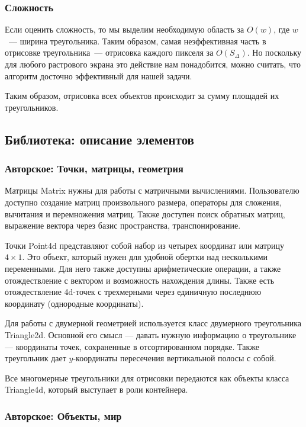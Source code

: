 \documentclass{article}
\begin{document}
\subsubsection{Сложность}

Если оценить сложность, то мы выделим необходимую область за $O(w)$, где $w$~--- ширина треугольника. Таким образом, самая неэффективная часть в отрисовке треугольника~--- отрисовка каждого пикселя за $O(S_{\Delta})$. Но поскольку для любого растрового экрана это действие нам понадобится, можно считать, что алгоритм досточно эффективный для нашей задачи.

Таким образом, отрисовка всех объектов происходит за сумму площадей их треугольников.

\newpage

\subsection{Библиотека: описание элементов}

\subsubsection{Авторское: Точки, матрицы, геометрия}

Матрицы Matrix нужны для работы с матричными вычислениями. Пользователю доступно создание матриц произвольного размера, операторы для сложения, вычитания и перемножения матриц. Также доступен поиск обратных матриц, выражение вектора через базис пространства, транспонирование.

Точки Point4d представляют собой набор из четырех координат или матрицу $4 \times 1$. Это объект, который нужен для удобной обертки над несколькими переменными. Для него также доступны арифметические операции, а также отождествление с вектором и возможность нахождения длины. Также есть отождествление 4d-точек с трехмерными через единичную последнюю координату (однородные координаты).

Для работы с двумерной геометрией используется класс двумерного треугольника Triangle2d. Основной его смысл — давать нужную информацию о треугольнике — координаты точек, сохраненные в отсортированном порядке. Также треугольник дает $y$-координаты пересечения вертикальной полосы с собой.

Все многомерные треугольники для отрисовки передаются как объекты класса Triangle4d, который выступает в роли контейнера.

\subsubsection{Авторское: Объекты, мир}
\end{document}
